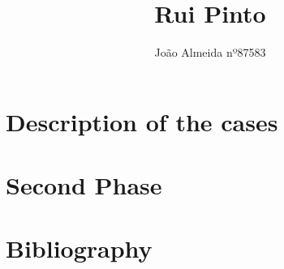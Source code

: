 \documentclass{article}
\title{Rui Pinto}
\author{ João Almeida nº87583}
\begin{document}
\maketitle

\section{Description of the cases}


\section{Second Phase}


\clearpage
\section{Bibliography}


\clearpage
\tableofcontents
\end{document}
